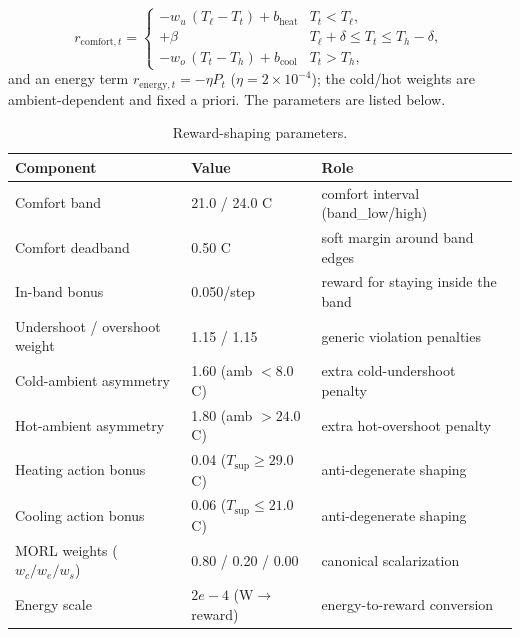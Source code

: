 \documentclass[11pt,a4paper]{article}
\begin{document}
\begin{equation}
 r_{\mathrm{comfort},t} =
 \begin{cases}
 -w_u\,(T_{\ell} - T_t) + b_{\mathrm{heat}} & T_t < T_{\ell}, \\
 +\beta & T_{\ell}+\delta \le T_t \le T_h-\delta, \\
 -w_o\,(T_t - T_h) + b_{\mathrm{cool}} & T_t > T_h,
 \end{cases}
 \label{eq:comfort}
\end{equation}
and an energy term $r_{\mathrm{energy},t}=-\eta P_t$ ($\eta=2\times10^{-4}$); the cold/hot weights are ambient-dependent and fixed a priori. The parameters are listed below.
\begin{table}[H]
\centering
\caption{Reward-shaping parameters.}
\label{tab:reward}
\small
\begin{tabularx}{\linewidth}{llX}
\toprule
Component & Value & Role \\
\midrule
Comfort band & 21.0 / 24.0 C & comfort interval (band\_low/high) \\
Comfort deadband & 0.50 C & soft margin around band edges \\
In-band bonus & 0.050/step & reward for staying inside the band \\
Undershoot / overshoot weight & 1.15 / 1.15 & generic violation penalties \\
Cold-ambient asymmetry & 1.60 (amb $<8.0$ C) & extra cold-undershoot penalty \\
Hot-ambient asymmetry & 1.80 (amb $>24.0$ C) & extra hot-overshoot penalty \\
Heating action bonus & 0.04 ($T_{\mathrm{sup}}\ge 29.0$ C) & anti-degenerate shaping \\
Cooling action bonus & 0.06 ($T_{\mathrm{sup}}\le 21.0$ C) & anti-degenerate shaping \\
MORL weights ($w_c/w_e/w_s$) & 0.80 / 0.20 / 0.00 & canonical scalarization \\
Energy scale & $2e-4$ (W$\to$reward) & energy-to-reward conversion \\
\bottomrule
\end{tabularx}
\end{table}
\end{document}

